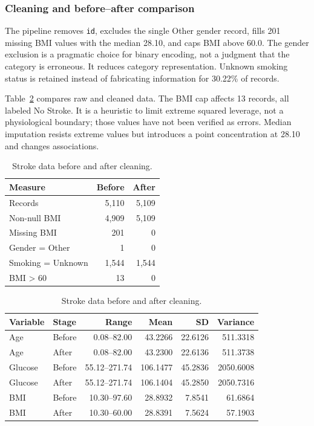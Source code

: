 \documentclass[12pt, a4paper]{article}
\begin{document}
\subsubsection{Cleaning and before--after comparison}
The pipeline removes \texttt{id}, excludes the single Other gender record, fills 201 missing BMI values with the median 28.10, and caps BMI above 60.0. The gender exclusion is a pragmatic choice for binary encoding, not a judgment that the category is erroneous. It reduces category representation. Unknown smoking status is retained instead of fabricating information for 30.22\% of records.

Table~\ref{tab:stroke-cleaning} compares raw and cleaned data. The BMI cap affects 13 records, all labeled No Stroke. It is a heuristic to limit extreme squared leverage, not a physiological boundary; those values have not been verified as errors. Median imputation resists extreme values but introduces a point concentration at 28.10 and changes associations.
\begin{table}[htbp]
\centering\small
\setlength{\tabcolsep}{4pt}\renewcommand{\arraystretch}{1.12}
\caption{Stroke data before and after cleaning.}
\label{tab:stroke-cleaning}
\begin{tabular}{p{.48\linewidth}rr}
\toprule
\raggedright \textbf{Measure} & \textbf{Before} & \textbf{After} \tabularnewline
\midrule
\raggedright Records & 5,110 & 5,109 \tabularnewline
\raggedright Non-null BMI & 4,909 & 5,109 \tabularnewline
\raggedright Missing BMI & 201 & 0 \tabularnewline
\raggedright Gender = Other & 1 & 0 \tabularnewline
\raggedright Smoking = Unknown & 1,544 & 1,544 \tabularnewline
\raggedright BMI > 60 & 13 & 0 \tabularnewline
\bottomrule
\end{tabular}
\par\medskip
\begin{tabular}{llrrrr}
\toprule
\textbf{Variable} & \textbf{Stage} & \textbf{Range} & \textbf{Mean} & \textbf{SD} & \textbf{Variance} \tabularnewline
\midrule
Age & Before & 0.08--82.00 & 43.2266 & 22.6126 & 511.3318 \tabularnewline
Age & After & 0.08--82.00 & 43.2300 & 22.6136 & 511.3738 \tabularnewline
Glucose & Before & 55.12--271.74 & 106.1477 & 45.2836 & 2050.6008 \tabularnewline
Glucose & After & 55.12--271.74 & 106.1404 & 45.2850 & 2050.7316 \tabularnewline
BMI & Before & 10.30--97.60 & 28.8932 & 7.8541 & 61.6864 \tabularnewline
BMI & After & 10.30--60.00 & 28.8391 & 7.5624 & 57.1903 \tabularnewline
\bottomrule
\end{tabular}
\par{}
\end{table}
\end{document}
